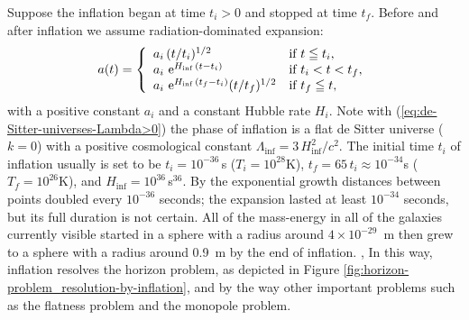 Suppose the inflation began at time $t_i > 0$ and stopped at time $t_f$. Before and after inflation we assume radiation-dominated expansion:
\begin{equation}
	a(t)
	= \left\{ \begin{array}{ll}
		a_i \, (t/t_i)^{1/2} & \mbox{if $t \leqq t_i$,} \\
		a_i \, \,\mathrm{e}^{H_{\mathrm{inf}} \, (t - t_i)} & \mbox{if $t_i < t < t_f$,} \\
		a_i \, \,\mathrm{e}^{H_{\mathrm{inf}} \, (t_f - t_i)} (t/t_f)^{1/2} & \mbox{if $t_f \leqq t$,}
	\end{array} \right.
\end{equation}
with a positive constant $a_i$ and a constant Hubble rate $H_i$. Note with (\ref{eq:de-Sitter-universes-Lambda>0}) the phase of inflation is a flat de Sitter universe ($k=0$) with a positive cosmological constant $\Lambda_{\mathrm{inf}} = 3 \, H_{\mathrm{inf}}^2 / c^2$.
The initial time $t_i$ of inflation usually is set to be $t_i = 10^{-36}$\,s ($T_i = 10^{28}$K), $t_f = 65\,t_i \approx 10^{-34}$s ($T_f = 10^{26}$K), and $H_{\mathrm{inf}} = 10^{36}$\,s$^{36}$.
By the exponential growth distances between points doubled every $10^{-36}$ seconds; the expansion lasted at least $10^{-34}$ seconds, but its full duration is not certain. All of the mass-energy in all of the galaxies currently visible started in a sphere with a radius around $4 \times 10^{-29}$~m then grew to a sphere with a radius around 0.9~m by the end of inflation. \cite[§7.2]{Dodelson-Schmidt-2025}, \cite[§10.4]{Ryden-2017}
In this way, inflation resolves the horizon problem, as depicted in Figure \ref{fig:horizon-problem_resolution-by-inflation}, and by the way other important problems such as the flatness problem and the monopole problem.


